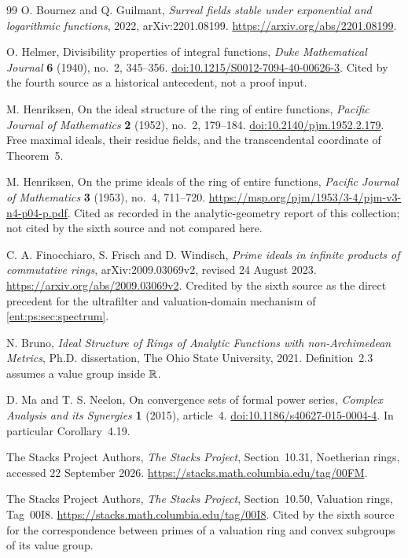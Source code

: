 \documentclass[11pt]{article}
\theoremstyle{plain}
\theoremstyle{plain}
\theoremstyle{plain}
\theoremstyle{definition}
\theoremstyle{definition}
\theoremstyle{definition}
\theoremstyle{definition}
\theoremstyle{remark}
\begin{document}
\begin{thebibliography}{99}
O. Bournez and Q. Guilmant, \emph{Surreal fields stable under exponential and
logarithmic functions}, 2022, arXiv:2201.08199.
\url{https://arxiv.org/abs/2201.08199}.

O. Helmer, Divisibility properties of integral functions, \emph{Duke
Mathematical Journal} \textbf{6} (1940), no.~2, 345--356.
\href{https://doi.org/10.1215/S0012-7094-40-00626-3}{doi:10.1215/S0012-7094-40-00626-3}.
Cited by the fourth source as a historical antecedent, not a proof input.

M. Henriksen, On the ideal structure of the ring of entire functions,
\emph{Pacific Journal of Mathematics} \textbf{2} (1952), no.~2, 179--184.
\href{https://doi.org/10.2140/pjm.1952.2.179}{doi:10.2140/pjm.1952.2.179}.
Free maximal ideals, their residue fields, and the transcendental coordinate
of Theorem~5.

M. Henriksen, On the prime ideals of the ring of entire functions,
\emph{Pacific Journal of Mathematics} \textbf{3} (1953), no.~4, 711--720.
\url{https://msp.org/pjm/1953/3-4/pjm-v3-n4-p04-p.pdf}.
Cited as recorded in the analytic-geometry report of this collection; not
cited by the sixth source and not compared here.

C. A. Finocchiaro, S. Frisch and D. Windisch, \emph{Prime ideals in
infinite products of commutative rings}, arXiv:2009.03069v2, revised
24 August 2023. \url{https://arxiv.org/abs/2009.03069v2}.
Credited by the sixth source as the direct precedent for the ultrafilter and
valuation-domain mechanism of \cref{ent:ps:sec:spectrum}.

N. Bruno, \emph{Ideal Structure of Rings of Analytic Functions with
non-Archimedean Metrics}, Ph.D. dissertation, The Ohio State University,
2021. Definition~2.3 assumes a value group inside $\mathbb R$.

D. Ma and T. S. Neelon, On convergence sets of formal power series,
\emph{Complex Analysis and its Synergies} \textbf{1} (2015), article~4.
\href{https://doi.org/10.1186/s40627-015-0004-4}{doi:10.1186/s40627-015-0004-4}.
In particular Corollary~4.19.

The Stacks Project Authors, \emph{The Stacks Project}, Section~10.31,
Noetherian rings, accessed 22 September 2026.
\url{https://stacks.math.columbia.edu/tag/00FM}.

The Stacks Project Authors, \emph{The Stacks Project}, Section~10.50,
Valuation rings, Tag~00I8. \url{https://stacks.math.columbia.edu/tag/00I8}.
Cited by the sixth source for the correspondence between primes of a
valuation ring and convex subgroups of its value group.


\end{thebibliography}
\end{document}

